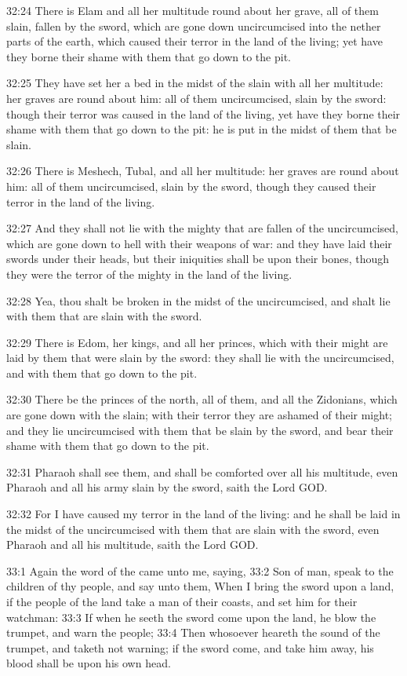 32:24 There is Elam and all her multitude round about her grave, all
of them slain, fallen by the sword, which are gone down uncircumcised
into the nether parts of the earth, which caused their terror in the
land of the living; yet have they borne their shame with them that go
down to the pit.

32:25 They have set her a bed in the midst of the slain with all her
multitude: her graves are round about him: all of them uncircumcised,
slain by the sword: though their terror was caused in the land of the
living, yet have they borne their shame with them that go down to the
pit: he is put in the midst of them that be slain.

32:26 There is Meshech, Tubal, and all her multitude: her graves are
round about him: all of them uncircumcised, slain by the sword, though
they caused their terror in the land of the living.

32:27 And they shall not lie with the mighty that are fallen of the
uncircumcised, which are gone down to hell with their weapons of war:
and they have laid their swords under their heads, but their
iniquities shall be upon their bones, though they were the terror of
the mighty in the land of the living.

32:28 Yea, thou shalt be broken in the midst of the uncircumcised, and
shalt lie with them that are slain with the sword.

32:29 There is Edom, her kings, and all her princes, which with their
might are laid by them that were slain by the sword: they shall lie
with the uncircumcised, and with them that go down to the pit.

32:30 There be the princes of the north, all of them, and all the
Zidonians, which are gone down with the slain; with their terror they
are ashamed of their might; and they lie uncircumcised with them that
be slain by the sword, and bear their shame with them that go down to
the pit.

32:31 Pharaoh shall see them, and shall be comforted over all his
multitude, even Pharaoh and all his army slain by the sword, saith the
Lord GOD.

32:32 For I have caused my terror in the land of the living: and he
shall be laid in the midst of the uncircumcised with them that are
slain with the sword, even Pharaoh and all his multitude, saith the
Lord GOD.

33:1 Again the word of the \LORD came unto me, saying, 33:2 Son of man,
speak to the children of thy people, and say unto them, When I bring
the sword upon a land, if the people of the land take a man of their
coasts, and set him for their watchman: 33:3 If when he seeth the
sword come upon the land, he blow the trumpet, and warn the people;
33:4 Then whosoever heareth the sound of the trumpet, and taketh not
warning; if the sword come, and take him away, his blood shall be upon
his own head.

